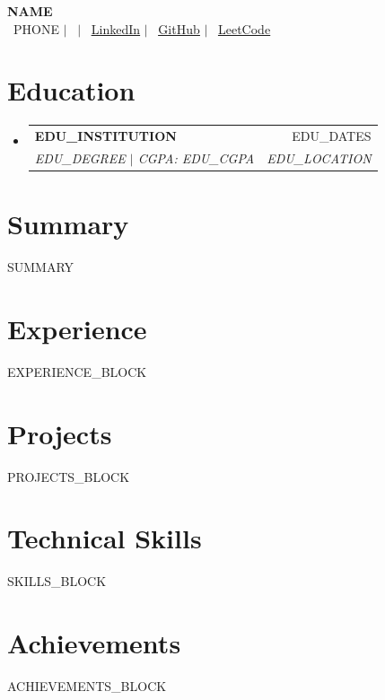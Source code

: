 \documentclass[letterpaper, {{FONT_SIZE}}pt]{article}
\makeatletter
\newcommand{\resumeSubheading}[4]{
  \vspace{-2pt}\item
    \begin{tabular*}{0.97\textwidth}[t]{l@{\extracolsep{\fill}}r}
      \textbf{#1} & #2 \\
      \textit{\small#3} & \textit{\small #4} \\
    \end{tabular*}\vspace{-5pt}
}
\newcommand{\resumeSubHeadingListStart}{\begin{itemize}[leftmargin=0.05in, label={}]}
\newcommand{\resumeSubHeadingListEnd}{\end{itemize}}
\newcommand{\resumeItemListStart}{\begin{itemize}[itemsep={{ITEM_SEP}}pt, parsep=0pt]}
\newcommand{\resumeItemListEnd}{\end{itemize}\vspace{-5pt}}
\makeatother
\begin{document}
\begin{center}
    \textbf{\Huge \scshape {{NAME}}} \\ \vspace{5pt}
    \small
    \faPhone\ {{PHONE}} \quad $|$ \quad
    \faEnvelope\ \href{mailto:{{{EMAIL}}}{\underline{{{EMAIL}}}}} \quad $|$ \quad
    \faLinkedin\ \href{{{LINKEDIN_URL}}}{\underline{LinkedIn}} \quad $|$ \quad
    \faGithub\ \href{{{GITHUB_URL}}}{\underline{GitHub}} \quad $|$ \quad
    \faCode\ \href{{{LEETCODE_URL}}}{\underline{LeetCode}}
\end{center}

\section{Education}
  \resumeSubHeadingListStart
    \resumeSubheading
      {{{EDU_INSTITUTION}}}{{{EDU_DATES}}}
      {{{EDU_DEGREE}} $|$ CGPA: {{EDU_CGPA}}}{{{EDU_LOCATION}}}
  \resumeSubHeadingListEnd

\section{Summary}
\small{
{{SUMMARY}}
}

\section{Experience}
  \resumeSubHeadingListStart
{{EXPERIENCE_BLOCK}}
  \resumeSubHeadingListEnd

\section{Projects}
  \resumeSubHeadingListStart
{{PROJECTS_BLOCK}}
  \resumeSubHeadingListEnd

\section{Technical Skills}
 \begin{itemize}[leftmargin=0.15in, label={}]
    \small{\item{
{{SKILLS_BLOCK}}
    }}
 \end{itemize}

\section{Achievements}
  \resumeItemListStart
{{ACHIEVEMENTS_BLOCK}}
  \resumeItemListEnd
\end{document}
